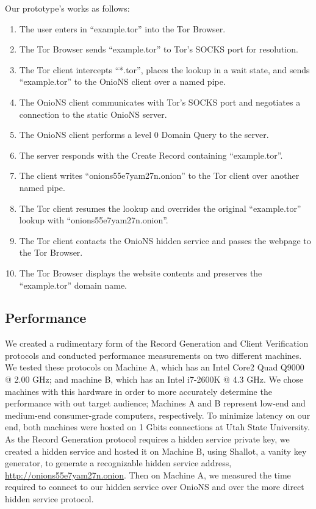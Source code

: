 \documentclass{sig-alternate}
\begin{document}
Our prototype's works as follows:

\begin{enumerate}
	\item The user enters in ``example.tor'' into the Tor Browser.
	\item The Tor Browser sends ``example.tor'' to Tor's SOCKS port for resolution.
	\item The Tor client intercepts ``*.tor'', places the lookup in a wait state, and sends ``example.tor'' to the OnioNS client over a named pipe.
	\item The OnioNS client communicates with Tor's SOCKS port and negotiates a connection to the static OnioNS server.
	\item The OnioNS client performs a level 0 Domain Query to the server.
	\item The server responds with the Create Record containing ``example.tor''.
	\item The client writes ``onions55e7yam27n.onion'' to the Tor client over another named pipe.
	\item The Tor client resumes the lookup and overrides the original ``example.tor'' lookup with ``onions55e7yam27n.onion''.
	\item The Tor client contacts the OnioNS hidden service and passes the webpage to the Tor Browser.
	\item The Tor Browser displays the website contents and preserves the ``example.tor'' domain name.
\end{enumerate}

\subsection{Performance}

We created a rudimentary form of the Record Generation and Client Verification protocols and conducted performance measurements on two different machines. We tested these protocols on Machine A, which has an Intel Core2 Quad Q9000 @ 2.00 GHz; and machine B, which has an Intel i7-2600K @ 4.3 GHz. We chose machines with this hardware in order to more accurately determine the performance with out target audience; Machines A and B represent low-end and medium-end consumer-grade computers, respectively. To minimize latency on our end, both machines were hosted on 1 Gbits connections at Utah State University. As the Record Generation protocol requires a hidden service private key, we created a hidden service and hosted it on Machine B, using Shallot, a vanity key generator, to generate a recognizable hidden service address, \url{http://onions55e7yam27n.onion}. Then on Machine A, we measured the time required to connect to our hidden service over OnioNS and over the more direct hidden service protocol.
\end{document}
